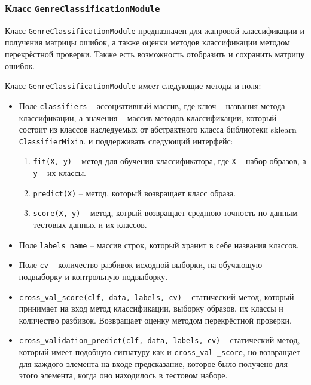 \subsubsection{Класс \texttt{GenreClassificationModule}}

Класс \texttt{GenreClassificationModule} предназначен для жанровой классификации и получения матрицы ошибок, а также оценки методов классификации методом перекрёстной проверки. Также есть возможность отобразить и сохранить матрицу ошибок.


Класс \texttt{GenreClassificationModule} имеет следующие методы и поля:

\begin{itemize}
\item{Поле \texttt{classifiers} -- ассоциативный массив, где ключ -- названия метода классификации, а значения -- массив методов классификации, который состоит из классов наследуемых от абстрактного класса библиотеки sklearn \texttt{ClassifierMixin}. и поддерживать следующий интерфейс:}
\begin{enumerate}[label=\arabic*.]
\item \texttt{fit(X, y)} -- метод для обучения классификатора, где \texttt{X} -- набор образов, а \texttt{y} -- их классы.
\item \texttt{predict(X)} -- метод, который возвращает класс образа.
\item \texttt{score(X, y)} -- метод, котрый возвращает среднюю точность по данным тестовых данных и их классов.
\end{enumerate}
\item{Поле \texttt{labels\_name} -- массив строк, который хранит в себе названия классов. }
\item{Поле \texttt{cv} -- количество разбивок исходной выборки, на обучающую подвыборку и контрольную подвыборку.}

\item{\texttt{cross\_val\_score(clf, data, labels, cv)} -- статический метод, который принимает на вход метод классификации, выборку образов, их классы и количество разбивок. Возвращает оценку методом перекрёстной проверки.}
\item{\texttt{cross\_validation\_predict(clf, data, labels, cv)} -- статический метод, который имеет подобную сигнатуру как и \texttt{cross\_val-}\texttt{\_score}, но возвращает для каждого элемента на входе предсказание, которое было получено для этого элемента, когда оно находилось в тестовом наборе. }


\end{itemize}
